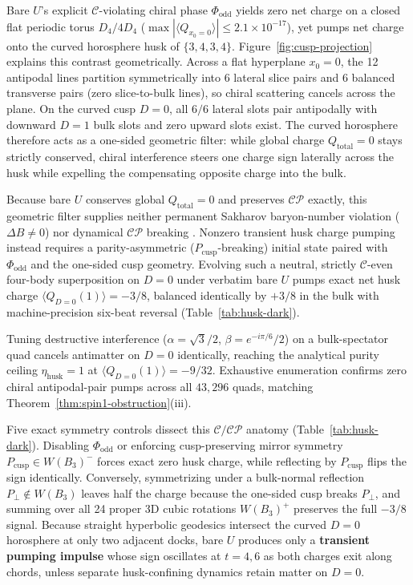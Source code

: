 Bare $U$'s explicit $\mathcal{C}$-violating chiral phase $\Phi_{\mathrm{odd}}$ yields zero net charge on a closed flat
periodic torus $D_4 / 4 D_4$ ($\max|\langle Q_{x_0=0}\rangle| \le 2.1 \times 10^{-17}$), yet pumps net charge onto the
curved horosphere husk of $\{3,4,3,4\}$. Figure~\ref{fig:cusp-projection} explains this contrast geometrically. Across a
flat hyperplane $x_0 = 0$, the 12 antipodal lines partition symmetrically into 6 lateral slice pairs and 6 balanced
transverse pairs (zero slice-to-bulk lines), so chiral scattering cancels across the plane. On the curved cusp $D = 0$,
all $6/6$ lateral slots pair antipodally with downward $D = 1$ bulk slots and zero upward slots exist. The curved
horosphere therefore acts as a one-sided geometric filter: while global charge $Q_{\mathrm{total}} = 0$ stays strictly
conserved, chiral interference steers one charge sign laterally across the husk while expelling the compensating
opposite charge into the bulk.

Because bare $U$ conserves global $Q_{\mathrm{total}} = 0$ and preserves $\mathcal{CP}$ exactly, this geometric filter
supplies neither permanent Sakharov baryon-number violation ($\Delta B \neq 0$) nor dynamical $\mathcal{CP}$ breaking
\cite{sakharov1967}. Nonzero transient husk charge pumping instead requires a parity-asymmetric
($P_{\mathrm{cusp}}$-breaking) initial state paired with $\Phi_{\mathrm{odd}}$ and the one-sided cusp geometry.
Evolving such a neutral, strictly $\mathcal{C}$-even four-body superposition on $D = 0$ under verbatim bare $U$ pumps
exact net husk charge $\langle Q_{D=0}(1)\rangle = -3/8$, balanced identically by $+3/8$ in the bulk with
machine-precision six-beat reversal (Table~\ref{tab:husk-dark}).

Tuning destructive interference ($\alpha = \sqrt{3}/2$, $\beta = e^{-i\pi/6}/2$) on a bulk-spectator quad cancels
antimatter on $D = 0$ identically, reaching the analytical purity ceiling $\eta_{\mathrm{husk}} = 1$ at
$\langle Q_{D=0}(1)\rangle = -9/32$. Exhaustive enumeration confirms zero chiral antipodal-pair pumps across all
$43{,}296$ quads, matching Theorem~\ref{thm:spin1-obstruction}(iii).

Five exact symmetry controls dissect this $\mathcal{C}/\mathcal{CP}$ anatomy (Table~\ref{tab:husk-dark}). Disabling
$\Phi_{\mathrm{odd}}$ or enforcing cusp-preserving mirror symmetry $P_{\mathrm{cusp}} \in W(B_3)^-$ forces exact zero
husk charge, while reflecting by $P_{\mathrm{cusp}}$ flips the sign identically. Conversely, symmetrizing under a
bulk-normal reflection $P_\perp \notin W(B_3)$ leaves half the charge because the one-sided cusp breaks $P_\perp$, and
summing over all 24 proper 3D cubic rotations $W(B_3)^+$ preserves the full $-3/8$ signal. Because straight hyperbolic
geodesics intersect the curved $D = 0$ horosphere at only two adjacent docks, bare $U$ produces only a \textbf{transient
pumping impulse} whose sign oscillates at $t = 4, 6$ as both charges exit along chords, unless separate husk-confining
dynamics retain matter on $D = 0$.

